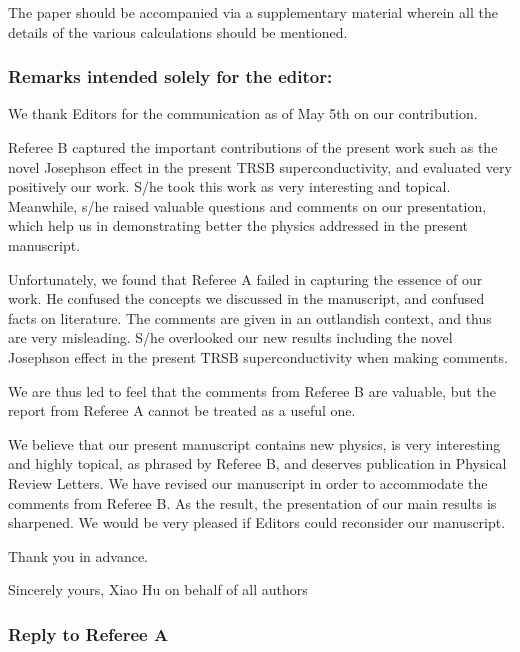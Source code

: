 \documentclass[11pt]{article}
\begin{document}
The paper should be accompanied via a supplementary material wherein all
the details of the various calculations should be mentioned.

\hypertarget{remarks-intended-solely-for-the-editor}{%
\subsubsection{Remarks intended solely for the
editor:}\label{remarks-intended-solely-for-the-editor}}

We thank Editors for the communication as of May 5th on our
contribution.

Referee B captured the important contributions of the present work such
as the novel Josephson effect in the present TRSB superconductivity, and
evaluated very positively our work. S/he took this work as very
interesting and topical. Meanwhile, s/he raised valuable questions and
comments on our presentation, which help us in demonstrating better the
physics addressed in the present manuscript.

Unfortunately, we found that Referee A failed in capturing the essence
of our work. He confused the concepts we discussed in the manuscript,
and confused facts on literature. The comments are given in an
outlandish context, and thus are very misleading. S/he overlooked our
new results including the novel Josephson effect in the present TRSB
superconductivity when making comments.

We are thus led to feel that the comments from Referee B are valuable,
but the report from Referee A cannot be treated as a useful one.

We believe that our present manuscript contains new physics, is very
interesting and highly topical, as phrased by Referee B, and deserves
publication in Physical Review Letters. We have revised our manuscript
in order to accommodate the comments from Referee B. As the result, the
presentation of our main results is sharpened. We would be very pleased
if Editors could reconsider our manuscript.

Thank you in advance.

Sincerely yours, Xiao Hu on behalf of all authors

\hypertarget{reply-to-referee-a}{%
\subsubsection{Reply to Referee A}\label{reply-to-referee-a}}
\end{document}
